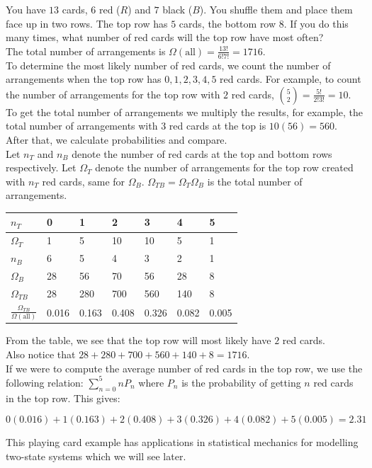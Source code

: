 \begin{texample}
	You have $13$ cards, $6$ red ($R$) and $7$ black ($B$). You shuffle them and place them face up in two rows. The top row has $5$ cards, the bottom row $8$. If you do this many times, what number of red cards will the top row have most often? \\
	
	The total number of arrangements is $\Omega(\text{all})=\frac{13!}{6!7!}=1716$. \\
	
	To determine the most likely number of red cards, we count the number of arrangements when the top row has $0, 1, 2, 3, 4, 5$ red cards. For example, to count the number of arrangements for the top row with $2$ red cards, $\binom{5}{2}=\frac{5!}{2!3!}=10$. To get the total number of arrangements we multiply the results, for example, the total number of arrangements with $3$ red cards at the top is $10(56)=560$. After that, we calculate probabilities and compare. \\
	
	Let $n_T$ and $n_B$ denote the number of red cards at the top and bottom rows respectively. Let $\Omega_T$ denote the number of arrangements for the top row created with $n_T$ red cards, same for $\Omega_B$. $\Omega_{TB}=\Omega_T\Omega_B$ is the total number of arrangements.
	
	\begin{center}
		\begin{tabular}{l|l|l|l|l|l|l}
			$n_T$ & 0 & 1 & 2 & 3 & 4 & 5 \\
			\hline
			$\Omega_T$ & 1 & 5 & 10 & 10 & 5 & 1 \\
			\hline
			$n_B$ & 6 & 5 & 4 & 3 & 2 & 1 \\
			\hline
			$\Omega_B$ & 28 & 56 & 70 & 56 & 28 & 8 \\
			\hline
			$\Omega_{TB}$ & 28 & 280 & 700 & 560 & 140 & 8 \\
			\hline
			$\frac{\Omega_{TB}}{\Omega(\text{all})}$ & 0.016 & 0.163 & 0.408 & 0.326 & 0.082 & 0.005
		\end{tabular}
	\end{center}
	
	From the table, we see that the top row will most likely have $2$ red cards. \\
	
	Also notice that $28+280+700+560+140+8=1716$. \\
	
	If we were to compute the average number of red cards in the top row, we use the following relation: $\sum_{n=0}^5 nP_n$ where $P_n$ is the probability of getting $n$ red cards in the top row. This gives:
	
	$$0(0.016) + 1(0.163) + 2(0.408) + 3(0.326) + 4(0.082) + 5(0.005)=2.31$$
	
	This playing card example has applications in statistical mechanics for modelling two-state systems which we will see later.
\end{texample}

